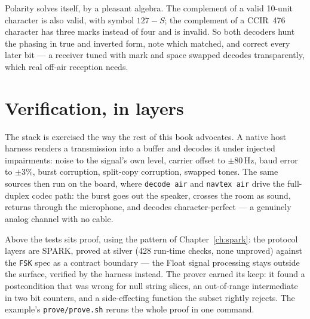 Polarity solves itself, by a pleasant algebra. The complement of a valid
10-unit character is also valid, with symbol $127-S$; the complement of a
CCIR~476 character has three marks instead of four and is invalid. So both
decoders hunt the phasing in true and inverted form, note which matched, and
correct every later bit --- a receiver tuned with mark and space swapped
decodes transparently, which real off-air reception needs.

\section{Verification, in layers}

The stack is exercised the way the rest of this book advocates. A native host
harness renders a transmission into a buffer and decodes it under injected
impairments: noise to the signal's own level, carrier offset to $\pm$80\,Hz,
baud error to $\pm$3\%, burst corruption, split-copy corruption, swapped
tones. The same sources then run on the board, where \texttt{decode air} and
\texttt{navtex air} drive the full-duplex codec path: the burst goes out the
speaker, crosses the room as sound, returns through the microphone, and
decodes character-perfect --- a genuinely analog channel with no cable.

Above the tests sits proof, using the pattern of Chapter~\ref{ch:spark}: the
protocol layers are SPARK, proved at silver (428 run-time checks, none
unproved) against the \texttt{FSK} spec as a contract boundary --- the Float
signal processing stays outside the surface, verified by the harness instead.
The prover earned its keep: it found a postcondition that was wrong for null
string slices, an out-of-range intermediate in two bit counters, and a
side-effecting function the subset rightly rejects. The example's
\texttt{prove/prove.sh} reruns the whole proof in one command.
